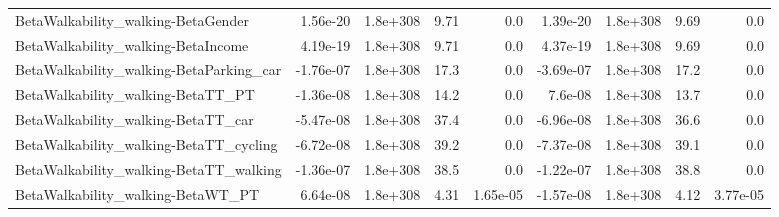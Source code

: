 \begin{tabular}{lrrrrrrrr}
BetaWalkability_walking-BetaGender & 1.56e-20 & 1.8e+308 & 9.71 & 0.0 & 1.39e-20 & 1.8e+308 & 9.69 & 0.0 \\
BetaWalkability_walking-BetaIncome & 4.19e-19 & 1.8e+308 & 9.71 & 0.0 & 4.37e-19 & 1.8e+308 & 9.69 & 0.0 \\
BetaWalkability_walking-BetaParking_car & -1.76e-07 & 1.8e+308 & 17.3 & 0.0 & -3.69e-07 & 1.8e+308 & 17.2 & 0.0 \\
BetaWalkability_walking-BetaTT_PT & -1.36e-08 & 1.8e+308 & 14.2 & 0.0 & 7.6e-08 & 1.8e+308 & 13.7 & 0.0 \\
BetaWalkability_walking-BetaTT_car & -5.47e-08 & 1.8e+308 & 37.4 & 0.0 & -6.96e-08 & 1.8e+308 & 36.6 & 0.0 \\
BetaWalkability_walking-BetaTT_cycling & -6.72e-08 & 1.8e+308 & 39.2 & 0.0 & -7.37e-08 & 1.8e+308 & 39.1 & 0.0 \\
BetaWalkability_walking-BetaTT_walking & -1.36e-07 & 1.8e+308 & 38.5 & 0.0 & -1.22e-07 & 1.8e+308 & 38.8 & 0.0 \\
BetaWalkability_walking-BetaWT_PT & 6.64e-08 & 1.8e+308 & 4.31 & 1.65e-05 & -1.57e-08 & 1.8e+308 & 4.12 & 3.77e-05 \\
\end{tabular}
